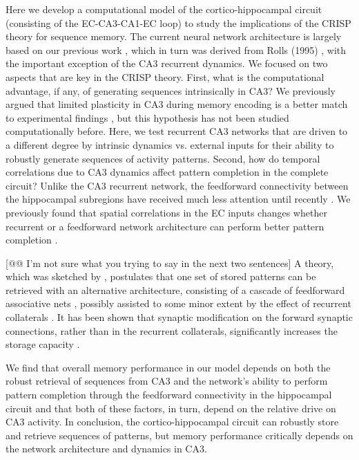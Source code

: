 \documentclass[utf8]{frontiersSCNS} %
\begin{document}
Here we develop a computational model of the cortico-hippocampal circuit (consisting of the EC-CA3-CA1-EC loop) to study the implications of the CRISP theory for sequence memory. The current neural network architecture is largely based on our previous work \citep{neher2015memory}, which in turn was derived from Rolls (1995) \citep{fontanari1995model}, with the important exception of the CA3 recurrent dynamics. We focused on two aspects that are key in the CRISP theory.
%
First, what is the computational advantage, if any, of generating sequences intrinsically in CA3? We previously argued that limited plasticity in CA3 during memory encoding is a better match to experimental findings \citep{cheng2013crisp,azizi2013computational}, but this hypothesis has not been studied computationally before. Here, we test recurrent CA3 networks that are driven to a different degree by intrinsic dynamics vs. external inputs for their ability to robustly generate sequences of activity patterns. 
%
Second, how do temporal correlations due to CA3 dynamics affect pattern completion in the complete circuit?  Unlike the CA3 recurrent network, the feedforward connectivity between the hippocampal subregions \citep{amaral1990chapter} have received much less attention until recently \citep{neher2015memory, pyka2014pattern}.  We previously found that spatial correlations in the EC inputs changes whether recurrent or a feedforward network architecture can perform better pattern completion \citep{neher2015memory}. 

[@@ I'm not sure what you trying to say in the next two sentences]
A theory, which was sketched by \citet{marr1991simple}, 
postulates that one set of stored patterns can be retrieved with an alternative architecture, consisting of a cascade of feedforward associative nets \citep{willshaw1969non}, possibly assisted to some minor extent by the effect of recurrent collaterals \citep{willshaw1990assessment}.
%
It has been shown that synaptic modification on the forward synaptic connections, rather than in the recurrent collaterals, significantly increases the storage capacity \citep{willshaw1990assessment}.

We find that overall memory performance in our model depends on both the robust retrieval of sequences from CA3 and the network’s ability to perform pattern completion through the feedforward connectivity in the hippocampal circuit and that both of these factors, in turn, depend on the relative drive on CA3 activity.
%
In conclusion, the cortico-hippocampal circuit can robustly store and retrieve sequences of patterns, but memory performance critically depends on the network architecture and dynamics in CA3. 
%
\end{document}
